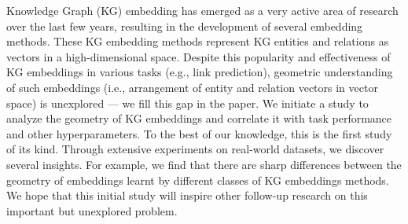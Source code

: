 Knowledge Graph (KG) embedding has emerged as a very active area of research over the last few years, resulting in the development of several embedding methods. These KG embedding methods represent KG entities and relations as vectors in a high-dimensional space. Despite this popularity and effectiveness of KG embeddings in various tasks (e.g., link prediction), geometric understanding of such embeddings (i.e., arrangement of entity and relation vectors in vector space) is unexplored --- we fill this gap in the paper. We initiate a study to analyze the geometry of KG embeddings and correlate it with task performance and other hyperparameters. To the best of our knowledge, this is the first study of its kind. Through extensive experiments on real-world datasets, we discover several insights. For example, we find that there are sharp differences between the geometry of embeddings learnt by different classes of KG embeddings methods. We hope that this initial study will inspire other follow-up research on this important but unexplored problem.
